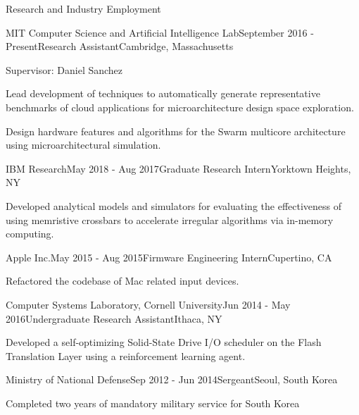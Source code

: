\documentclass{resume} %
\begin{document}
\begin{rSection}{Research and Industry Employment}

\begin{rSubsection}{MIT Computer Science and Artificial Intelligence Lab}{September 2016 - Present}{Research Assistant}{Cambridge, Massachusetts}

\item Supervisor: Daniel Sanchez
\item Lead development of techniques to automatically generate representative benchmarks of cloud applications 
for microarchitecture design space exploration.
\item Design hardware features and algorithms for the Swarm multicore architecture using microarchitectural simulation.
\end{rSubsection}

\begin{rSubsection}{IBM Research}{May 2018 - Aug 2017}{Graduate Research Intern}{Yorktown Heights, NY}

\item Developed analytical models and simulators for evaluating the effectiveness of using memristive crossbars
to accelerate irregular algorithms via in-memory computing.
\end{rSubsection}

\begin{rSubsection}{Apple Inc.}{May 2015 - Aug 2015}{Firmware Engineering Intern}{Cupertino, CA}

\item Refactored the codebase of Mac related input devices. 
\end{rSubsection}

\begin{rSubsection}{Computer Systems Laboratory, Cornell University}{Jun 2014 - May 2016}{Undergraduate Research Assistant}{Ithaca, NY}

\item Developed a self-optimizing Solid-State Drive I/O scheduler on the Flash Translation Layer using a reinforcement learning agent. 
\end{rSubsection}

\begin{rSubsection}{Ministry of National Defense}{Sep 2012 - Jun 2014}{Sergeant}{Seoul, South Korea}

\item Completed two years of mandatory military service for South Korea
\end{rSubsection}

\end{rSection}
\end{document}
